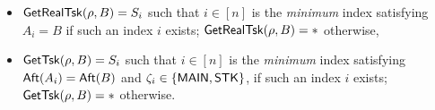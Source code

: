 \begin{itemize}
	\item $\mathsf{GetRealTsk}(\rho, B) = S_i$ such that $i \in [n]$ is the \emph{minimum} index satisfying $A_i = B$ if such an index $i$ exists; $\mathsf{GetRealTsk}(\rho, B) = *$ otherwise,
	
    \item $\mathsf{GetTsk}(\rho, B) = S_i$ such that $i \in [n]$ is the \emph{minimum} index satisfying ${\sf Aft}(A_i)={\sf Aft}(B)$ and $\zeta_i \in \{{\sf MAIN},{\sf STK}\}$, if such an index $i$ exists; $\mathsf{GetTsk}(\rho, B) = *$ otherwise.
	
\end{itemize}

